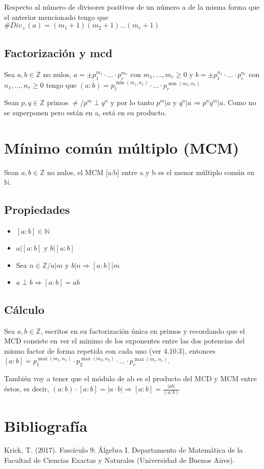\documentclass{report}
\newcommand{\card}[1]{\##1}
\begin{document}
Respecto al número de divisores positivos de un número a de la misma forma que el anterior mencionado tengo que $\card{Div_+(a)} = (m_1 + 1)(m_2 + 1)...(m_r + 1)$

\subsection{Factorización y mcd}
Sea $a,b \in \mathbb{Z}$ no nulos, $a = \pm p_1^{m_1} \cdot ... \cdot p_r^{m_r}$ con $m_1,...,m_r \geq 0$ y $b = \pm p_1^{n_1} \cdot ... \cdot p_r^{n_r}$ con $n_1,...,n_r \geq 0$ tengo que \begin{math}
    (a:b) = p_1^{\min(m_1, n_1)} \cdot \ldots \cdot p_r^{\min(m_r, n_r)}
\end{math}

Sean $p, q \in \mathbb{Z}$ primos $\neq/ p^m \perp q^n$ y por lo tanto $p^m|a$ y $q^n|a \Rightarrow p^nq^m|a$. Como no se superponen pero están en a, está en su producto.

\section{Mínimo común múltiplo (MCM)}

Sean $a,b \in \mathbb{Z}$ no nulos, el MCM [a:b] entre a y b es el menor múltiplo común en $\mathbb{N}$.

\subsection{Propiedades}
\begin{itemize}
    \item $[a:b] \in \mathbb{N}$
    \item $a|[a:b]$ y $b|[a:b]$
    \item Sea $n \in \mathbb{Z}/a|m \text{ y } b|n \Rightarrow [a:b] | m$
    \item $a \perp b \Rightarrow [a:b] = ab$
\end{itemize}

\subsection{Cálculo}
Sea $a,b \in \mathbb{Z}$, escritos en su factorización única en primos y recordando que el MCD consiste en ver el minimo de los exponentes entre las dos potencias del mismo factor de forma repetida con cada uno (ver 4.10.3), entonces $[a:b] = p_1^{\max(m_1, n_1)} \cdot p_2^{\max(m_2,n_2)} \cdot ... \cdot p_r^{\max(m_r,n_r)}$.

También voy a tener que el módulo de ab es el producto del MCD y MCM entre éstos, es decir, $(a:b) \cdot [a:b] = |a \cdot b| \Rightarrow [a:b] = \frac{|ab|}{(a:b)}$ 

\section{Bibliografía}
Krick, T. (2017). Fascículo 9: Álgebra I. Departamento de Matemática de la Facultad de Ciencias Exactas y Naturales (Universidad de Buenos Aires).
\end{document}
